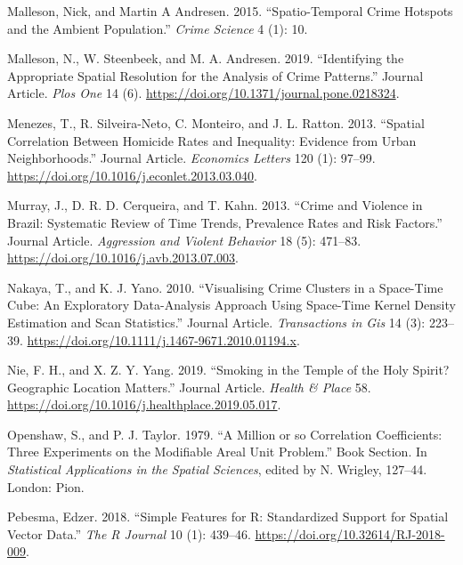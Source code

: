 \documentclass[smallextended]{svjour3}       %
\begin{document}
\leavevmode\hypertarget{ref-Malleson2015spatio}{}%
Malleson, Nick, and Martin A Andresen. 2015. ``Spatio-Temporal Crime
Hotspots and the Ambient Population.'' \emph{Crime Science} 4 (1): 10.

\leavevmode\hypertarget{ref-Malleson2019identifying}{}%
Malleson, N., W. Steenbeek, and M. A. Andresen. 2019. ``Identifying the
Appropriate Spatial Resolution for the Analysis of Crime Patterns.''
Journal Article. \emph{Plos One} 14 (6).
\url{https://doi.org/10.1371/journal.pone.0218324}.

\leavevmode\hypertarget{ref-Menezes2013spatial}{}%
Menezes, T., R. Silveira-Neto, C. Monteiro, and J. L. Ratton. 2013.
``Spatial Correlation Between Homicide Rates and Inequality: Evidence
from Urban Neighborhoods.'' Journal Article. \emph{Economics Letters}
120 (1): 97--99. \url{https://doi.org/10.1016/j.econlet.2013.03.040}.

\leavevmode\hypertarget{ref-Murray2013crime}{}%
Murray, J., D. R. D. Cerqueira, and T. Kahn. 2013. ``Crime and Violence
in Brazil: Systematic Review of Time Trends, Prevalence Rates and Risk
Factors.'' Journal Article. \emph{Aggression and Violent Behavior} 18
(5): 471--83. \url{https://doi.org/10.1016/j.avb.2013.07.003}.

\leavevmode\hypertarget{ref-Nakaya2010visualizing}{}%
Nakaya, T., and K. J. Yano. 2010. ``Visualising Crime Clusters in a
Space-Time Cube: An Exploratory Data-Analysis Approach Using Space-Time
Kernel Density Estimation and Scan Statistics.'' Journal Article.
\emph{Transactions in Gis} 14 (3): 223--39.
\url{https://doi.org/10.1111/j.1467-9671.2010.01194.x}.

\leavevmode\hypertarget{ref-Nie2019smoking}{}%
Nie, F. H., and X. Z. Y. Yang. 2019. ``Smoking in the Temple of the Holy
Spirit? Geographic Location Matters.'' Journal Article. \emph{Health \&
Place} 58. \url{https://doi.org/10.1016/j.healthplace.2019.05.017}.

\leavevmode\hypertarget{ref-Openshaw1979million}{}%
Openshaw, S., and P. J. Taylor. 1979. ``A Million or so Correlation
Coefficients: Three Experiments on the Modifiable Areal Unit Problem.''
Book Section. In \emph{Statistical Applications in the Spatial
Sciences}, edited by N. Wrigley, 127--44. London: Pion.

\leavevmode\hypertarget{ref-Pebesma2018simple}{}%
Pebesma, Edzer. 2018. ``Simple Features for R: Standardized Support for
Spatial Vector Data.'' \emph{The R Journal} 10 (1): 439--46.
\url{https://doi.org/10.32614/RJ-2018-009}.
\end{document}
